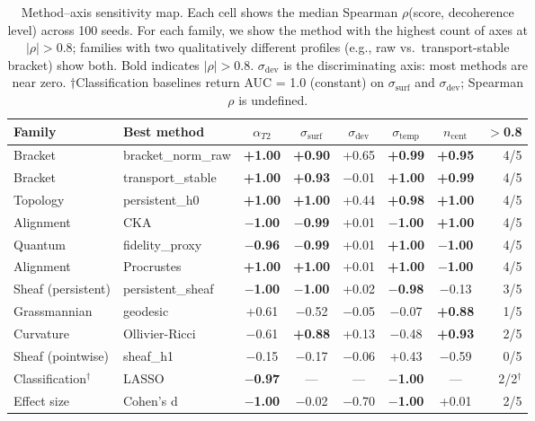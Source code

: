 \documentclass[11pt]{article}
\begin{document}
\begin{table}[t]
\centering
\caption{Method--axis sensitivity map.  Each cell shows the median
  Spearman $\rho$(score, decoherence level) across 100 seeds.  For each
  family, we show the method with the highest count of axes at
  $|\rho| > 0.8$; families with two qualitatively different profiles
  (e.g., raw vs.\ transport-stable bracket) show both.  Bold indicates
  $|\rho| > 0.8$.  $\sigma_\text{dev}$ is the discriminating axis:
  most methods are near zero.  $\dagger$Classification baselines return
  AUC = 1.0 (constant) on $\sigma_\text{surf}$ and $\sigma_\text{dev}$;
  Spearman $\rho$ is undefined.}
\label{tab:sensitivity}
\small
\begin{tabular}{@{}llcccccr@{}}
\toprule
Family & Best method & $\alpha_{T2}$ & $\sigma_\text{surf}$ & $\sigma_\text{dev}$ & $\sigma_\text{temp}$ & $n_\text{cent}$ & $>$0.8 \\
\midrule
Bracket & bracket\_norm\_raw & \textbf{+1.00} & \textbf{+0.90} & +0.65 & \textbf{+0.99} & \textbf{+0.95} & 4/5 \\
Bracket & transport\_stable & \textbf{+1.00} & \textbf{+0.93} & $-$0.01 & \textbf{+1.00} & \textbf{+0.99} & 4/5 \\
Topology & persistent\_h0 & \textbf{+1.00} & \textbf{+1.00} & +0.44 & \textbf{+0.98} & \textbf{+1.00} & 4/5 \\
Alignment & CKA & \textbf{$-$1.00} & \textbf{$-$0.99} & +0.01 & \textbf{$-$1.00} & \textbf{+1.00} & 4/5 \\
Quantum & fidelity\_proxy & \textbf{$-$0.96} & \textbf{$-$0.99} & +0.01 & \textbf{+1.00} & \textbf{$-$1.00} & 4/5 \\
Alignment & Procrustes & \textbf{+1.00} & \textbf{+1.00} & +0.01 & \textbf{+1.00} & \textbf{$-$1.00} & 4/5 \\
Sheaf (persistent) & persistent\_sheaf & \textbf{$-$1.00} & \textbf{$-$1.00} & +0.02 & \textbf{$-$0.98} & $-$0.13 & 3/5 \\
\midrule
Grassmannian & geodesic & +0.61 & $-$0.52 & $-$0.05 & $-$0.07 & \textbf{+0.88} & 1/5 \\
Curvature & Ollivier-Ricci & $-$0.61 & \textbf{+0.88} & +0.13 & $-$0.48 & \textbf{+0.93} & 2/5 \\
Sheaf (pointwise) & sheaf\_h1 & $-$0.15 & $-$0.17 & $-$0.06 & +0.43 & $-$0.59 & 0/5 \\
\midrule
Classification$^\dagger$ & LASSO & \textbf{$-$0.97} & --- & --- & \textbf{$-$1.00} & --- & 2/2$^\dagger$ \\
Effect size & Cohen's d & \textbf{$-$1.00} & $-$0.02 & $-$0.70 & \textbf{$-$1.00} & +0.01 & 2/5 \\
\bottomrule
\end{tabular}
\end{table}
\end{document}
